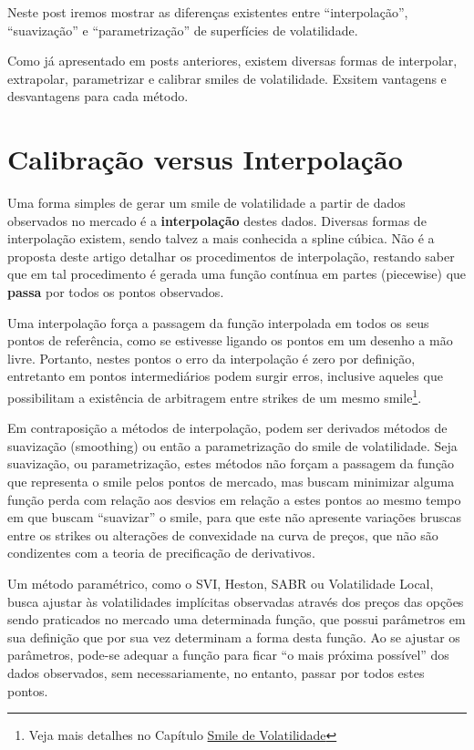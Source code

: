 \documentclass[]{book}
\let\rmarkdownfootnote\footnote%
\def\footnote{\protect\rmarkdownfootnote}
\begin{document}
Neste post iremos mostrar as diferenças existentes entre
``interpolação'', ``suavização'' e ``parametrização'' de superfícies de
volatilidade.

Como já apresentado em posts anteriores, existem diversas formas de
interpolar, extrapolar, parametrizar e calibrar smiles de volatilidade.
Exsitem vantagens e desvantagens para cada método.

\section{Calibração versus
Interpolação}\label{calibracao-versus-interpolacao}

Uma forma simples de gerar um smile de volatilidade a partir de dados
observados no mercado é a \textbf{interpolação} destes dados. Diversas
formas de interpolação existem, sendo talvez a mais conhecida a spline
cúbica. Não é a proposta deste artigo detalhar os procedimentos de
interpolação, restando saber que em tal procedimento é gerada uma função
contínua em partes (piecewise) que \textbf{passa} por todos os pontos
observados.

Uma interpolação força a passagem da função interpolada em todos os seus
pontos de referência, como se estivesse ligando os pontos em um desenho
a mão livre. Portanto, nestes pontos o erro da interpolação é zero por
definição, entretanto em pontos intermediários podem surgir erros,
inclusive aqueles que possibilitam a existência de arbitragem entre
strikes de um mesmo smile\footnote{Veja mais detalhes no Capítulo
  \protect\hyperlink{arbestatica}{Smile de Volatilidade}}.

Em contraposição a métodos de interpolação, podem ser derivados métodos
de suavização (smoothing) ou então a parametrização do smile de
volatilidade. Seja suavização, ou parametrização, estes métodos não
forçam a passagem da função que representa o smile pelos pontos de
mercado, mas buscam minimizar alguma função perda com relação aos
desvios em relação a estes pontos ao mesmo tempo em que buscam
``suavizar'' o smile, para que este não apresente variações bruscas
entre os strikes ou alterações de convexidade na curva de preços, que
não são condizentes com a teoria de precificação de derivativos.

Um método paramétrico, como o SVI, Heston, SABR ou Volatilidade Local,
busca ajustar às volatilidades implícitas observadas através dos preços
das opções sendo praticados no mercado uma determinada função, que
possui parâmetros em sua definição que por sua vez determinam a forma
desta função. Ao se ajustar os parâmetros, pode-se adequar a função para
ficar ``o mais próxima possível'' dos dados observados, sem
necessariamente, no entanto, passar por todos estes pontos.
\end{document}
